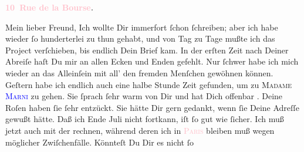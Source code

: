            \pstart
           \begin{otherlanguage}{french}\textcolor{gray}{\textbf{\textbf{\textcolor{pink}{10 Rue de la Bourse}{}\ledrightnote{\textcolor{pink}{rue de la Bourse}}.}}}\end{otherlanguage}\pend
           \pstart\center{}Mein lieber Freund,\pend\pstart
           Ich wollte Dir immerfort ſchon ſchreiben; aber ich habe wieder ſo hunderterlei zu
               thun gehabt, und von Tag zu Tage mußte ich das Project verſchieben, bis endlich Dein
               Brief kam.\pend
           \pstart
           In der erſten Zeit nach Deiner Abreiſe haſt Du mir an allen Ecken und Enden gefehlt.
               Nur ſchwer habe ich mich wieder an das Alleinſein mit  all’ den fremden Menſchen gewöhnen können.\pend
           \pstart
           Geſtern habe ich endlich auch eine halbe Stunde Zeit
               gefunden, um zu \textsc{Madame 
                  \textcolor{blue}{Marni}{}\ledrightnote{\textcolor{blue}{Jeanne Marni}}} zu gehen. Sie ſprach ſehr warm von Dir und {\pb}hat Dich offenbar \label{K_L02814-1v}\label{K_L02814-1h}. Deine Roſen haben ſie ſehr entzückt. Sie hätte Dir gern gedankt,
               wenn ſie Deine Adreſſe gewußt hätte.\pend
           \pstart
           Daß ich Ende Juli nicht fortkann, iſt ſo gut wie ſicher.
               Ich muß jetzt auch mit der \label{K_L02814-2v}\label{K_L02814-2h} rechnen, während deren ich in \textsc{\textcolor{pink}{Paris}{}\ledrightnote{\textcolor{pink}{Paris}}} bleiben muß wegen möglicher Zwiſchenfälle. Könnteſt Du Dir es nicht ſo
